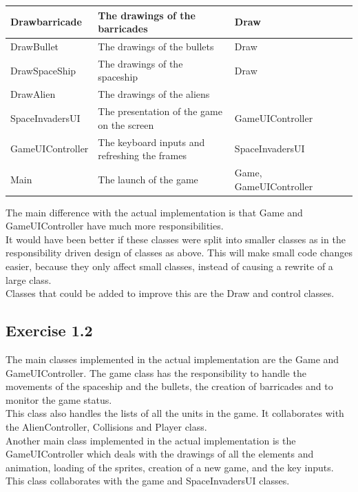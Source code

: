 \documentclass[10pt]{article}
\begin{document}
\begin{center}
\begin{tabular}{ | p{3cm} | p{5cm} | p{3cm} | p{2cm} | p{2cm} |}
  Drawbarricade & The drawings of the barricades & Draw & &  \\  \hline
  DrawBullet & The drawings of the bullets & Draw & &  \\  \hline
  DrawSpaceShip & The drawings of the spaceship & Draw & &  \\  \hline
  DrawAlien  & The drawings of the aliens & & &  \\  \hline
  SpaceInvadersUI & The presentation of the game on the screen & GameUIController & &  \\  \hline
  GameUIController & The keyboard inputs and refreshing the frames & SpaceInvadersUI & &  \\  \hline
  Main & The launch of the game & Game, GameUIController & &  \\  \hline
    \end{tabular}
\end{center}
\hfill\break
The main difference with the actual implementation is that Game and GameUIController have much more responsibilities.\\
It would have been better if these classes were split into smaller classes as in the responsibility driven design of classes as above. This will make small code changes easier, because they only affect small classes, instead of causing a rewrite of a large class.\\ Classes that could be added to improve this are the Draw and control classes. 

\subsection*{Exercise 1.2}
The main classes implemented in the actual implementation are the Game and GameUIController.
The game class has the responsibility to handle the movements of the spaceship and the bullets, the creation of barricades and to monitor the game status.\\
This class also handles the lists of all the units in the game. It collaborates with the AlienController, Collisions and Player class. \\
Another main class implemented in the actual implementation is the GameUIController which deals with the drawings of all the elements and animation, loading of the sprites, creation of a new game,  and the key inputs. This class collaborates with the game and SpaceInvadersUI classes.\\
\end{document}
